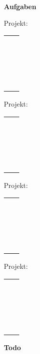 %
%



\newcommand{\TodoProjectHeader}{%
	\makebox[0pt][l]{\smash[b]{\color{WriteBgDay}\rule[0.4\baselineskip]{1.09\textwidth}{0.5\baselineskip}}}%
	\parbox[t]{\linewidth}{Projekt:}%
}

\newlength{\TodoColWidth}
\setlength{\TodoColWidth}{.45\textwidth}

\newcommand{\TodoNoteRow}{%
	\cellcolor{WriteBgDay}\hspace{1.5em} & \vstrut{1em}\hspace{-1pt}{\color{WriteBgDay}\rule{\TodoColWidth}{\arrayrulewidth}}\\
}

\newcommand{\TodoTable}{
	\begin{tabular*}{\linewidth}{cc}
		\rowcolor{SymbMainWeek}%
		\bfseries\vstrut{1em}{\color{white}\makebox[1.5em]{\ding{51}}} & \bfseries\vstrut{1em}{\color{white}\hspace{.5em}\ding{50}\hspace{.81\TodoColWidth}}\\
		\rowcolor{white}
		\TodoNoteRow
		\TodoNoteRow
		\TodoNoteRow
		\TodoNoteRow
		\TodoNoteRow
		\TodoNoteRow
		\TodoNoteRow
		\TodoNoteRow
		\TodoNoteRow
		\TodoNoteRow
		\TodoNoteRow
		\TodoNoteRow
		\TodoNoteRow
		\TodoNoteRow
		\TodoNoteRow
		\TodoNoteRow
		\TodoNoteRow
		\TodoNoteRow
	\end{tabular*}
}

\newcommand{\LeftPageTodo}{%
	{\color{SymbMainWeek}\bfseries\Large Aufgaben\vstrut[-0.2em]{1.2em}}\par
	\nointerlineskip
	\bigskip
	\begin{minipage}{.45\textwidth}
		\TodoProjectHeader
		\smallskip
		\TodoTable
	\end{minipage}
	\hfill
	\begin{minipage}{.45\textwidth}
		\TodoProjectHeader
		\smallskip
		\TodoTable
	\end{minipage}
	\newline
	\vstrut{1em}
	\newline
	\begin{minipage}{.45\textwidth}
		\TodoProjectHeader
		\smallskip
		\TodoTable
	\end{minipage}
	\hfill
	\begin{minipage}{.45\textwidth}
		\TodoProjectHeader
		\smallskip
		\TodoTable
	\end{minipage}
	\clearpage
}

\newcommand{\RightPageTodo}{%
	{\hspace*{\fill}\color{SymbMainWeek}\bfseries\Large Todo\vstrut[-0.2em]{1.2em}}\par
	\clearpage
}

\LeftPageTodo

\RightPageTodo
